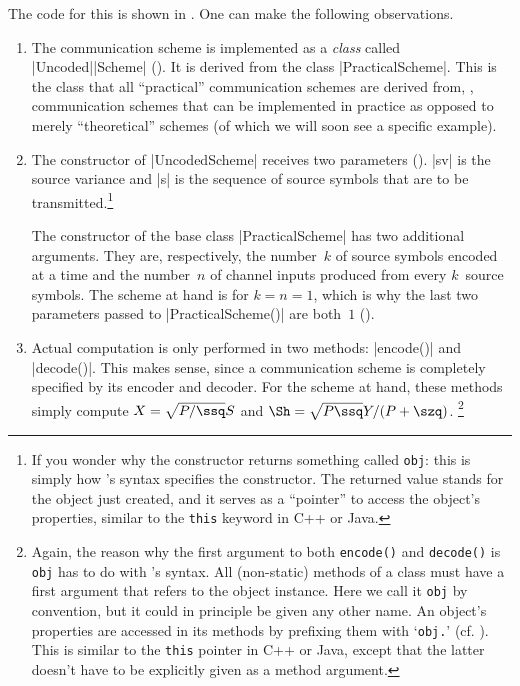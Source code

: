 The code for this is shown in .  One can make the following
observations.
\begin{enumerate}
  \item The communication scheme is implemented as a \emph{class} called
    |Uncoded|\-|Scheme| (). It is derived from the class
    |PracticalScheme|. This is the class that all ``practical'' communication
    schemes are derived from, \ie, communication schemes that can be implemented
    in practice as opposed to merely ``theoretical'' schemes (of which we will
    soon see a specific example).

  \item The constructor of |UncodedScheme| receives two parameters
    (). |sv| is the source variance and |s| is the sequence of source
    symbols that are to be transmitted.\footnote{If you wonder why the
    constructor returns something called \Verb+obj+: this is simply how
    \matlab's syntax specifies the constructor.  The returned value stands for
    the object just created, and it serves as a ``pointer'' to access the
    object's properties, similar to the \Verb+this+ keyword in C++ or Java.}

    The constructor of the base class |PracticalScheme| has two additional
    arguments. They are, respectively, the number~$k$ of source symbols encoded
    at a time and the number~$n$ of channel inputs produced from every
    $k$~source symbols. The scheme at hand is for $k = n = 1$, which is why the
    last two parameters passed to |PracticalScheme()| are both~$1$
    ().

  \item Actual computation is only performed in two methods: |encode()| and
    |decode()|. This makes sense, since a communication scheme is completely
    specified by its encoder and decoder.  For the scheme at hand, these
    methods simply compute $X = \sqrt{P/\ssq} S$ and $\Sh = \sqrt{P \ssq} Y /
    (P + \szq)$.%
    \footnote{Again, the reason why the first argument to both \Verb+encode()+
    and \Verb+decode()+ is \Verb+obj+ has to do with \matlab's syntax. All
    (non-static) methods of a class must have a first argument that refers to
    the object instance. Here we call it \Verb+obj+ by convention, but it could
    in principle be given any other name. An object's properties are accessed in
    its methods by prefixing them with `\Verb+obj.+' (cf.  ).
    This is similar to the \Verb+this+ pointer in C++ or Java, except that the
    latter doesn't have to be explicitly given as a method argument.}
\end{enumerate}


